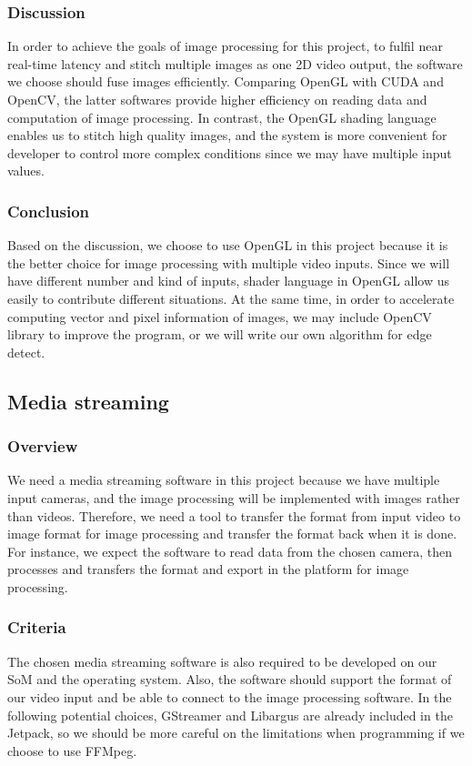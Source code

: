 \subsubsection{Discussion}
In order to achieve the goals of image processing for this project, to fulfil near real-time latency and 
stitch multiple images as one 2D video output, the software we choose should fuse images efficiently. 
Comparing OpenGL with CUDA and OpenCV, the latter softwares provide higher efficiency on reading data and 
computation of image processing. In contrast, the OpenGL shading language enables us to stitch high 
quality images, and the system is more convenient for developer to control more complex conditions since 
we may have multiple input values.\\


\subsubsection{Conclusion}
Based on the discussion, we choose to use OpenGL in this project because it is the better choice for 
image processing with multiple video inputs. Since we will have different number and kind of inputs, 
shader language in OpenGL allow us easily to contribute different situations. At the same time, in order 
to accelerate computing vector and pixel information of images, we may include OpenCV library to improve 
the program, or we will write our own algorithm for edge detect. \\


\subsection{Media streaming}
\subsubsection{Overview}
We need a media streaming software in this project because we have multiple input cameras, and the image 
processing will be implemented with images rather than videos. Therefore, we need a tool to transfer the 
format from input video to image format for image processing and transfer the format back when it is done. 
For instance, we expect the software to read data from the chosen camera, then processes and transfers 
the format and export in the platform for image processing.\\

\subsubsection{Criteria}
The chosen media streaming software is also required to be developed on our SoM and the operating 
system. Also, the software should support the format of our video input and be able to connect to 
the image processing software. In the following potential choices, GStreamer and Libargus are 
already included in the Jetpack, so we should be more careful on the limitations when programming 
if we choose to use FFMpeg. \\

